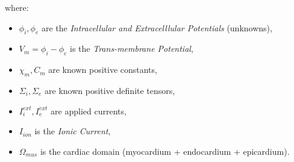 \documentclass[a4paper,11pt]{article}
\begin{document}
	where:
	\begin{itemize}[label=\textendash]
		\item $\phi_i, \phi_e$ are the \emph{Intracellular and Extracelllular Potentials} (unknowns),
		\item $V_m = \phi_i-\phi_e$ is the \emph{Trans-membrane Potential},
		\item $\chi_m,C_m$ are known positive constants,
		\item $\Sigma_i, \Sigma_e$ are known positive definite tensors,
		\item $I_i^{ext},I_e^{ext}$ are applied currents,
		\item $I_{ion}$ is the \emph{Ionic Current},
		\item $\Omega_{mus}$ is the cardiac domain (myocardium + endocardium + epicardium).
	\end{itemize}
    
\end{document}
